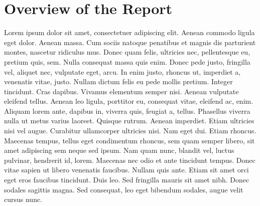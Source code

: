 \section{Overview of the Report}

Lorem ipsum dolor sit amet, consectetuer adipiscing elit. Aenean commodo ligula eget dolor. Aenean massa. Cum sociis natoque penatibus et magnis dis parturient montes, nascetur ridiculus mus. Donec quam felis, ultricies nec, pellentesque eu, pretium quis, sem. Nulla consequat massa quis enim. Donec pede justo, fringilla vel, aliquet nec, vulputate eget, arcu. In enim justo, rhoncus ut, imperdiet a, venenatis vitae, justo. Nullam dictum felis eu pede mollis pretium. Integer tincidunt. Cras dapibus. Vivamus elementum semper nisi. Aenean vulputate eleifend tellus. Aenean leo ligula, porttitor eu, consequat vitae, eleifend ac, enim. Aliquam lorem ante, dapibus in, viverra quis, feugiat a, tellus. Phasellus viverra nulla ut metus varius laoreet. Quisque rutrum. Aenean imperdiet. Etiam ultricies nisi vel augue. Curabitur ullamcorper ultricies nisi. Nam eget dui. Etiam rhoncus. Maecenas tempus, tellus eget condimentum rhoncus, sem quam semper libero, sit amet adipiscing sem neque sed ipsum. Nam quam nunc, blandit vel, luctus pulvinar, hendrerit id, lorem. Maecenas nec odio et ante tincidunt tempus. Donec vitae sapien ut libero venenatis faucibus. Nullam quis ante. Etiam sit amet orci eget eros faucibus tincidunt. Duis leo. Sed fringilla mauris sit amet nibh. Donec sodales sagittis magna. Sed consequat, leo eget bibendum sodales, augue velit cursus nunc.
